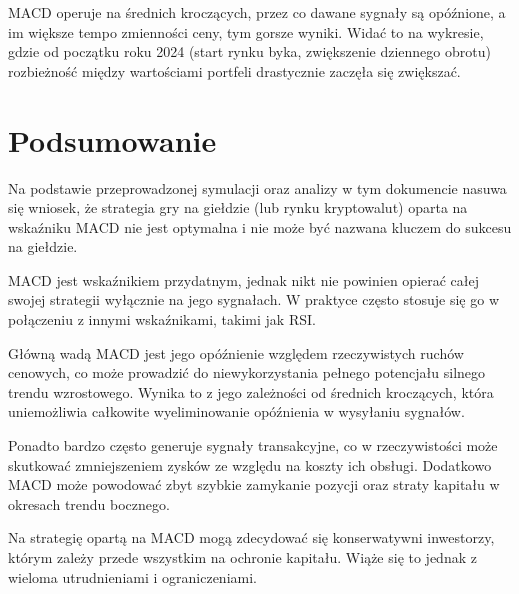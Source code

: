 \documentclass[11pt]{article}
\begin{document}
    MACD operuje na średnich kroczących, przez co dawane sygnały są opóźnione, a im większe tempo zmienności ceny, tym gorsze wyniki. 
    Widać to na wykresie, gdzie od początku roku 2024 (start rynku byka, zwiększenie dziennego obrotu) rozbieżność między wartościami portfeli drastycznie zaczęła się zwiększać.

    \section{Podsumowanie}
    Na podstawie przeprowadzonej symulacji oraz analizy w tym dokumencie nasuwa się wniosek, że strategia gry na giełdzie (lub rynku kryptowalut) oparta na wskaźniku MACD nie jest optymalna i nie może być nazwana kluczem do sukcesu na giełdzie.

    MACD jest wskaźnikiem przydatnym, jednak nikt nie powinien opierać całej swojej strategii wyłącznie na jego sygnałach.
    W praktyce często stosuje się go w połączeniu z innymi wskaźnikami, takimi jak RSI\cite{investopedia:rsi}.
    
    Główną wadą MACD jest jego opóźnienie względem rzeczywistych ruchów cenowych, co może prowadzić do niewykorzystania pełnego potencjału silnego trendu wzrostowego.
    Wynika to z jego zależności od średnich kroczących, która uniemożliwia całkowite wyeliminowanie opóźnienia w wysyłaniu sygnałów.
    
    Ponadto bardzo często generuje sygnały transakcyjne, co w rzeczywistości może skutkować zmniejszeniem zysków ze względu na koszty ich obsługi.
    Dodatkowo MACD może powodować zbyt szybkie zamykanie pozycji oraz straty kapitału w okresach trendu bocznego.

    Na strategię opartą na MACD mogą zdecydować się konserwatywni inwestorzy, którym zależy przede wszystkim na ochronie kapitału.
    Wiąże się to jednak z wieloma utrudnieniami i ograniczeniami.
    \newpage
    \printbibliography[
        heading=bibintoc,
        title={Bibliografia}
    ]
\end{document}
